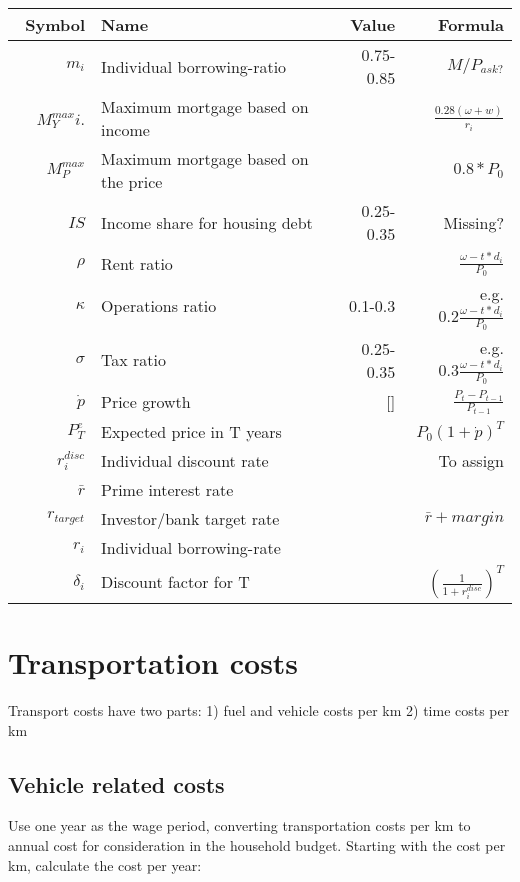 \renewcommand{\arraystretch}{1.5}
\begin{tabular}{rlrr}\
Symbol         & Name                                 & Value      & Formula  \\ \hline
$m_i$          & Individual borrowing-ratio           & 0.75-0.85  & $M/P_{ask?}$ \\
$M^{max}_Yi$.  & Maximum mortgage based on income     &            & $\frac{0.28(\omega+w)}{r_i}$ \\
 $M^{max}_P$   & Maximum mortgage based on the price  &            & $0.8*P_0$ \\
$IS$           & Income share for housing debt        & 0.25-0.35  & Missing? \\
$\rho$         & Rent ratio                           &            & $\frac{\omega-t*d_i}{P_0}$ \\
$\kappa $      & Operations ratio                     & 0.1-0.3    & e.g. $ 0.2\frac{\omega-t*d_i}{P_0}$ \\
$\sigma$       & Tax ratio                            & 0.25-0.35  & e.g. $ 0.3\frac{\omega-t*d_i}{P_0}$ \\
$\dot p $      & Price growth                         &[]          & $\frac{P_t-P_{t-1}}{P_{t-1}}$\\
$P^e_T$        & Expected price in T years            &            & $P_0(1+\dot p)^T$ \\
$r^{disc}_i$   & Individual discount rate             &            & To assign \\
$\bar r$       & Prime interest rate                  &            & \\
$r_{target}$   & Investor/bank target rate            &            & $\bar r + margin$ \\
$r_i$          & Individual borrowing-rate            &            & \\
$\delta_i$     & Discount factor for T                &            & $\left(\frac{1}{1+r^{disc}_i}\right)^T$ \\
\end{tabular}
\renewcommand{\arraystretch}{1.0}

\section{Transportation costs}
Transport costs have two parts:
1) fuel and vehicle costs per km
2) time costs per km

\subsection{Vehicle related costs}
Use one year as the wage period, converting transportation costs per km to annual cost for consideration in the household budget. Starting with the cost per km, calculate the cost per year:

